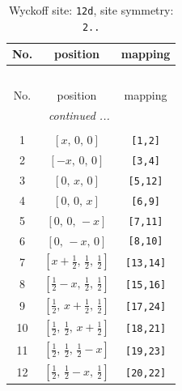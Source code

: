 \documentclass[fleqn,8pt]{jsarticle}
\begin{document}
\begin{longtable}{ccc}
\caption{Wyckoff site: {\tt 12d}, site symmetry: {\tt 2..}}
 \\
 \hline \hline
No. & position & mapping \\ \hline \endfirsthead

\multicolumn{2}{l}{\tablename\ \thetable{}} \\
 \hline \hline
No. & position & mapping \\ \hline \endhead

 \hline \hline
\multicolumn{2}{r}{\footnotesize\it continued ...} \\ \endfoot

 \hline \hline
\multicolumn{2}{r}{} \\ \endlastfoot

1 & $\left[ x,\, 0,\, 0 \right]$ & {\tt [1,2]} \\ \hline
2 & $\left[ - x,\, 0,\, 0 \right]$ & {\tt [3,4]} \\ \hline
3 & $\left[ 0,\, x,\, 0 \right]$ & {\tt [5,12]} \\ \hline
4 & $\left[ 0,\, 0,\, x \right]$ & {\tt [6,9]} \\ \hline
5 & $\left[ 0,\, 0,\, - x \right]$ & {\tt [7,11]} \\ \hline
6 & $\left[ 0,\, - x,\, 0 \right]$ & {\tt [8,10]} \\ \hline
7 & $\left[ x + \frac{1}{2},\, \frac{1}{2},\, \frac{1}{2} \right]$ & {\tt [13,14]} \\ \hline
8 & $\left[ \frac{1}{2} - x,\, \frac{1}{2},\, \frac{1}{2} \right]$ & {\tt [15,16]} \\ \hline
9 & $\left[ \frac{1}{2},\, x + \frac{1}{2},\, \frac{1}{2} \right]$ & {\tt [17,24]} \\ \hline
10 & $\left[ \frac{1}{2},\, \frac{1}{2},\, x + \frac{1}{2} \right]$ & {\tt [18,21]} \\ \hline
11 & $\left[ \frac{1}{2},\, \frac{1}{2},\, \frac{1}{2} - x \right]$ & {\tt [19,23]} \\ \hline
12 & $\left[ \frac{1}{2},\, \frac{1}{2} - x,\, \frac{1}{2} \right]$ & {\tt [20,22]} \\
\end{longtable}
\renewcommand{\arraystretch}{1.2}
\end{document}
